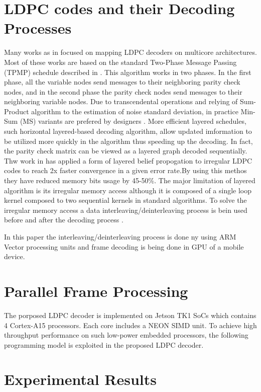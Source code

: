 \documentclass[conference]{IEEEtran}
\begin{document}
\section{LDPC codes and their Decoding Processes}

Many works as in \cite{art_massively, art_ldpc_cpu0,art_ldpc_OpenCl_1,art_gpu_0} focused on mapping LDPC decoders on multicore architectures. Most of these works are based on the standard Two-Phase Message Passing (TPMP) schedule described in \cite{art_massively}. This algorithm works in two phases. In the first phase, all the variable nodes send messages to their neighboring parity check nodes, and in the second phase the parity check nodes send messages to their neighboring variable nodes. Due to transcendental operations and relying of Sum-Product algorithm to the estimation of noise standard deviation, in practice Min-Sum (MS) variants are prefered by designers \cite{art_neon}. More efficient layered schedules, such horizontal layered-based decoding algorithm, allow updated imformation to be utilized more quickly in the algorithm thus speeding up the decoding\cite{art_layered0, art_layered1}. In fact, the parity check matrix can be viewed as a layered graph decoded sequentially. Thw work in \cite{art_gpu_0} has applied a form of layered belief propogation to irregular LDPC codes to reach 2x faster convergence in a given error rate.By using this methos they have reduced memory bits usage by 45-50\%. The major limitation of layered algorithm is its irregular memory access although it is composed of a single loop kernel composed to two sequential kernels in standard algorithms. To solve the irregular memory access a data interleaving/deinterleaving process is bein used before and after the decoding process \cite{art_gpu_0, art_neon}.

In this paper the interleaving/deinterleaving process is done ny using ARM Vector processing units and frame decoding is being done in GPU of a mobile device.

\section{Parallel Frame Processing}
The porposed LDPC decoder is implemented on Jetson TK1 SoCs which contains 4 Cortex-A15 processors. Each core includes a NEON SIMD unit. To achieve high throughput performance on such low-power embedded processors, the following programming model is exploited in the proposed LDPC decoder.


\section{Experimental Results}
\end{document}

